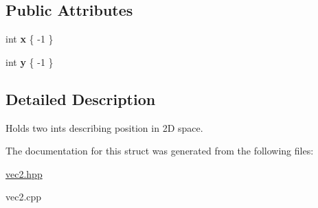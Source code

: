 \subsection*{Public Attributes}
\begin{DoxyCompactItemize}
\item 
\mbox{\label{structhw_1_1vec2_a234ad55719b97bc28ce90bf8f724d154}} 
int {\bfseries x} \{ -\/1 \}
\item 
\mbox{\label{structhw_1_1vec2_af4e933a3c6376bae59fbb0aabe3b290c}} 
int {\bfseries y} \{ -\/1 \}
\end{DoxyCompactItemize}


\subsection{Detailed Description}
Holds two ints describing position in 2D space. 

The documentation for this struct was generated from the following files\+:\begin{DoxyCompactItemize}
\item 
\mbox{\hyperlink{vec2_8hpp}{vec2.\+hpp}}\item 
vec2.\+cpp\end{DoxyCompactItemize}

